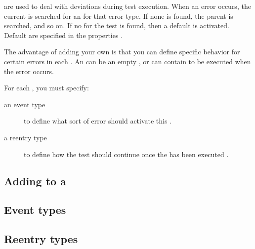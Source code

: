 
\gdehandlers{} are \gdcases{} used to deal with deviations during test execution. When an error occurs, the current \gdcase{} is searched for an \gdehandler{} for that error type. If none is found, the parent \gdcase{} is searched, and so on. If no \gdehandler{} for the test is found, then a default \gdehandler{} is activated. Default \gdehandlers{} are specified in the \gdsuite{} properties . 

The advantage of adding your own \gdehandlers{} is that you can define specific behavior for certain errors in each \gdcase{}. An \gdehandler{} can be an empty \gdcase{}, or can contain \gdcases{} to be executed when the error occurs. 

For each \gdehandler{}, you must specify:
\begin{description}
\item [an event type] {to define what sort of error should activate this \gdcase{} .} 
\item [a reentry type]{to define how the test should continue once the \gdehandler{} has been executed .}
\end{description}

\subsection{Adding \gdehandlers{} to a \gdcase{}}


\subsection{Event types}


\subsection{Reentry types}








